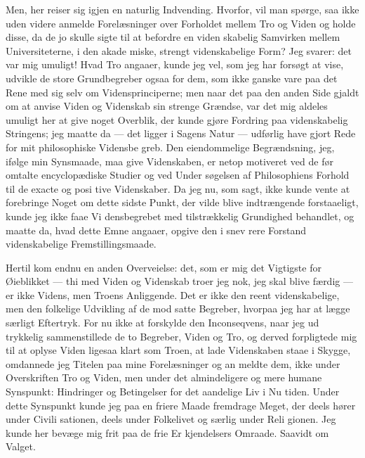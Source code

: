 \documentclass[12pt]{book}
\newcommand{\opage}[1]{\marginnote{\footnotesize\textit{[#1]}}}
\begin{document}
Men, her reiser sig igjen en naturlig Indvending.
Hvorfor, vil man spørge, saa ikke uden videre anmelde
Forelæsninger over Forholdet mellem Tro og Viden og
holde disse, da de jo skulle sigte til at befordre en viden\-%
skabelig Samvirken mellem Universiteterne, i den akade\-%
\opage{282}\setcounter{footnote}{0}%
miske, strengt videnskabelige Form? Jeg svarer: det var
mig umuligt! Hvad Tro angaaer, kunde jeg vel, som jeg
har forsøgt at vise, udvikle de store Grundbegreber ogsaa
for dem, som ikke ganske vare paa det Rene med sig
selv om Vidensprinciperne; men naar det paa den anden
Side gjaldt om at anvise Viden og Videnskab sin strenge
Grændse, var det mig aldeles umuligt her at give noget
Overblik, der kunde gjøre Fordring paa videnskabelig
Stringens; jeg maatte da --- det ligger i Sagens Natur ---
udførlig have gjort Rede for mit philosophiske Vidensbe\-%
greb. Den eiendommelige Begrændsning, jeg, ifølge min
Synsmaade, maa give Videnskaben, er netop motiveret
ved de før omtalte encyclopædiske Studier og ved Under\-%
søgelsen af Philosophiens Forhold til de exacte og posi\-%
tive Videnskaber. Da jeg nu, som sagt, ikke kunde vente
at forebringe Noget om dette sidste Punkt, der vilde
blive indtrængende forstaaeligt, kunde jeg ikke faae Vi\-%
densbegrebet med tilstrækkelig Grundighed behandlet, og
maatte da, hvad dette Emne angaaer, opgive den i snev\-%
rere Forstand videnskabelige Fremstillingsmaade.

Hertil kom endnu en anden Overveielse: det, som
er mig det Vigtigste for Øieblikket --- thi med Viden og
Videnskab troer jeg nok, jeg skal blive færdig --- er ikke
Videns, men Troens Anliggende. Det er ikke den reent
videnskabelige, men den folkelige Udvikling af de mod\-%
satte Begreber, hvorpaa jeg har at lægge særligt Eftertryk.
For nu ikke at forskylde den Inconseqvens, naar jeg ud\-%
trykkelig sammenstillede de to Begreber, Viden og Tro,
og derved forpligtede mig til at oplyse Viden ligesaa
klart som Troen, at lade Videnskaben staae i Skygge,
omdannede jeg Titelen paa mine Forelæsninger og an\-%
meldte dem, ikke under Overskriften Tro og Viden, men
under det almindeligere og mere humane Synspunkt:
Hindringer og Betingelser for det aandelige Liv i Nu\-%
\opage{283}\setcounter{footnote}{0}%
tiden. Under dette Synspunkt kunde jeg paa en friere
Maade fremdrage Meget, der deels hører under Civili\-%
sationen, deels under Folkelivet og særlig under Reli\-%
gionen. Jeg kunde her bevæge mig frit paa de frie Er\-%
kjendelsers Omraade. Saavidt om Valget.
\end{document}
